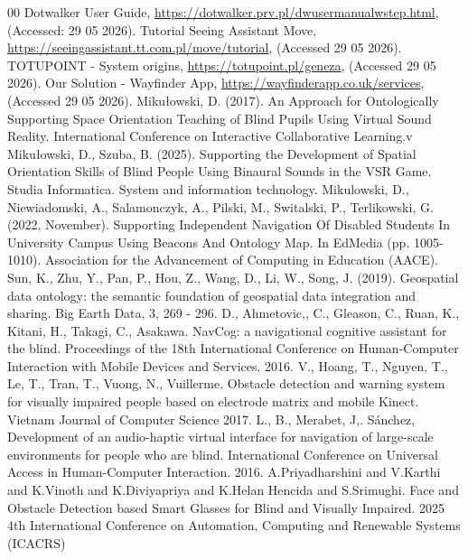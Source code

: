 \documentclass[conference]{IEEEtran}
\begin{document}
\renewcommand{\refname}{}
\begin{thebibliography}{00}
 Dotwalker User Guide, \url{https://dotwalker.prv.pl/dwusermanualwstep.html}, (Accessed: 29 05 2026).
 Tutorial Seeing Assistant Move, \url{https://seeingassistant.tt.com.pl/move/tutorial}, (Accessed 29 05 2026).
 TOTUPOINT - System origins, \url{https://totupoint.pl/geneza}, (Accessed 29 05 2026).
 Our Solution - Wayfinder App, \url{https://wayfinderapp.co.uk/services}, (Accessed 29 05 2026).
 Mikułowski, D. (2017). An Approach for Ontologically Supporting Space Orientation Teaching of Blind Pupils Using Virtual Sound Reality. International Conference on Interactive Collaborative Learning.v
 Mikułowski, D., Szuba, B. (2025). Supporting the Development of Spatial Orientation Skills of Blind People Using Binaural Sounds in the VSR Game. Studia Informatica. System and information technology.
 Mikulowski, D., Niewiadomski, A., Salamonczyk, A., Pilski, M., Switalski, P., Terlikowski, G. (2022, November). Supporting Independent Navigation Of Disabled Students In University Campus Using Beacons And Ontology Map. In EdMedia (pp. 1005-1010). Association for the Advancement of Computing in Education (AACE).
 Sun, K., Zhu, Y., Pan, P., Hou, Z., Wang, D., Li, W., Song, J. (2019). Geospatial data ontology: the semantic foundation of geospatial data integration and sharing. Big Earth Data, 3, 269 - 296.
 D., Ahmetovic,, C., Gleason, C., Ruan, K., Kitani, H., Takagi, C., Asakawa. NavCog: a navigational cognitive assistant for the blind. Proceedings of the 18th International Conference on Human-Computer Interaction with Mobile Devices and Services. 2016.
 V., Hoang, T., Nguyen, T., Le, T., Tran, T., Vuong, N., Vuillerme. Obstacle detection and warning system for visually impaired people based on electrode matrix and mobile Kinect. Vietnam Journal of Computer Science 2017.
 L., B., Merabet, J,. Sánchez, Development of an audio-haptic virtual interface for navigation of large-scale environments for people who are blind. International Conference on Universal Access in Human-Computer Interaction. 2016.
 A.Priyadharshini and V.Karthi and K.Vinoth and K.Diviyapriya and K.Helan Hencida and S.Srimughi. Face and Obstacle Detection based Smart Glasses for Blind and Visually Impaired. 2025 4th International Conference on Automation, Computing and Renewable Systems (ICACRS)

\end{thebibliography}
\end{document}
